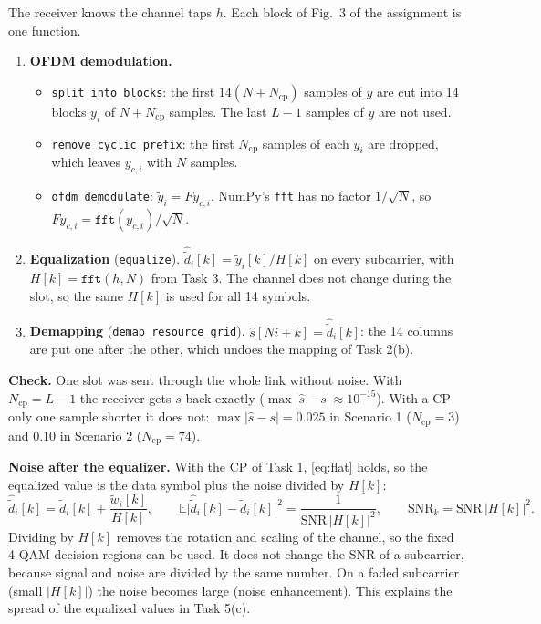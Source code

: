 \documentclass[11pt,a4paper]{article}
\newcommand{\Ncp}{N_{\mathrm{cp}}}
\newcommand{\SNR}{\mathrm{SNR}}
\newcommand{\E}{\mathbb{E}}
\newcommand{\yt}{\tilde{y}}
\newcommand{\dt}{\tilde{d}}
\newcommand{\deq}{\hat{\tilde{d}}}
\newcommand{\wt}{\tilde{w}}
\begin{document}
The receiver knows the channel taps $h$. Each block of Fig.~3 of the assignment is one function.
\begin{enumerate}[label=(\alph*)]
  \item \textbf{OFDM demodulation.}
        \begin{itemize}
          \item \texttt{split\_into\_blocks}: the first $14(N + \Ncp)$ samples of $y$ are cut into 14 blocks
                $y_i$ of $N + \Ncp$ samples. The last $L - 1$ samples of $y$ are not used.
          \item \texttt{remove\_cyclic\_prefix}: the first $\Ncp$ samples of each $y_i$ are dropped, which
                leaves $y_{c,i}$ with $N$ samples.
          \item \texttt{ofdm\_demodulate}: $\yt_i = F y_{c,i}$. NumPy's \texttt{fft} has no factor
                $1/\sqrt{N}$, so $F y_{c,i} = \texttt{fft}(y_{c,i})/\sqrt{N}$.
        \end{itemize}
  \item \textbf{Equalization} (\texttt{equalize}). $\deq_i[k] = \yt_i[k]/H[k]$ on every subcarrier, with
        $H[k] = \texttt{fft}(h, N)$ from Task 3. The channel does not change during the slot, so the
        same $H[k]$ is used for all 14 symbols.
  \item \textbf{Demapping} (\texttt{demap\_resource\_grid}). $\hat{s}[Ni + k] = \deq_i[k]$: the 14 columns
        are put one after the other, which undoes the mapping of Task 2(b).
\end{enumerate}
\textbf{Check.} One slot was sent through the whole link without noise. With
$\Ncp = L - 1$ the receiver gets $s$ back exactly ($\max|\hat{s} - s| \approx 10^{-15}$). With a CP only
one sample shorter it does not: $\max|\hat{s} - s| = 0.025$ in Scenario 1 ($\Ncp = 3$) and 0.10 in
Scenario 2 ($\Ncp = 74$).

\textbf{Noise after the equalizer.} With the CP of Task 1, \eqref{eq:flat} holds, so the equalized
value is the data symbol plus the noise divided by $H[k]$:
\begin{equation}
  \deq_i[k] = \dt_i[k] + \frac{\wt_i[k]}{H[k]}, \qquad
  \E\big|\deq_i[k] - \dt_i[k]\big|^2 = \frac{1}{\SNR\, |H[k]|^2}, \qquad
  \SNR_k = \SNR\, |H[k]|^2.
  \label{eq:eqnoise}
\end{equation}
Dividing by $H[k]$ removes the rotation and scaling of the channel, so the fixed 4-QAM decision
regions can be used. It does not change the SNR of a subcarrier, because signal and noise are divided
by the same number. On a faded subcarrier (small $|H[k]|$) the noise becomes large (noise
enhancement). This explains the spread of the equalized values in Task 5(c).
\end{document}
